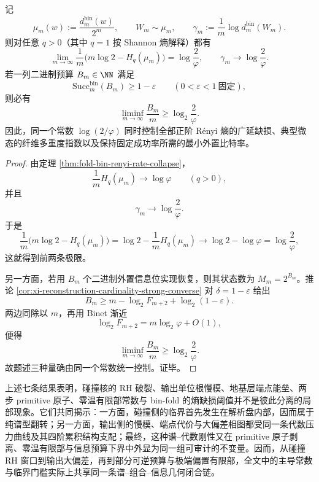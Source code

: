 \begin{theorem}[熵缺损常数的三重同一化]\label{thm:xi-time-part68-entropy-deficit-triple-identification}
记
\[
\mu_m(w):=\frac{d_m^{\mathrm{bin}}(w)}{2^m},
\qquad
W_m\sim\mu_m,
\qquad
\gamma_m:=\frac{1}{m}\log d_m^{\mathrm{bin}}(W_m).
\]
则对任意 \(q>0\)（其中 \(q=1\) 按 Shannon 熵解释）都有
\[
\lim_{m\to\infty}\frac{1}{m}\bigl(m\log 2-H_q(\mu_m)\bigr)
=
\log\frac{2}{\varphi},
\qquad
\gamma_m\longrightarrow \log\frac{2}{\varphi}.
\]
若一列二进制预算 \(B_m\in\NN\) 满足
\[
\mathrm{Succ}_m^{\mathrm{bin}}(B_m)\ge 1-\varepsilon
\qquad
(0<\varepsilon<1\ \text{固定}),
\]
则必有
\[
\liminf_{m\to\infty}\frac{B_m}{m}
\ge
\log_2\frac{2}{\varphi}.
\]
因此，同一个常数 \(\log(2/\varphi)\) 同时控制全部正阶 Rényi 熵的广延缺损、典型微态的纤维多重度指数以及保持固定成功率所需的最小外置比特率。
\end{theorem}
\begin{proof}
由定理 \ref{thm:fold-bin-renyi-rate-collapse}，
\[
\frac{1}{m}H_q(\mu_m)\longrightarrow \log\varphi
\qquad (q>0),
\]
并且
\[
\gamma_m\longrightarrow \log\frac{2}{\varphi}.
\]
于是
\[
\frac{1}{m}\bigl(m\log 2-H_q(\mu_m)\bigr)
=
\log 2-\frac{1}{m}H_q(\mu_m)
\longrightarrow
\log 2-\log\varphi
=
\log\frac{2}{\varphi},
\]
这就得到前两条极限。

另一方面，若用 \(B_m\) 个二进制外置信息位实现恢复，则其状态数为 \(M_m=2^{B_m}\)。推论 \ref{cor:xi-reconstruction-cardinality-strong-converse} 对 \(\delta=1-\varepsilon\) 给出
\[
B_m
\ge
m-\log_2F_{m+2}+\log_2(1-\varepsilon).
\]
两边同除以 \(m\)，再用 Binet 渐近
\[
\log_2F_{m+2}=m\log_2\varphi+O(1),
\]
便得
\[
\liminf_{m\to\infty}\frac{B_m}{m}\ge \log_2\frac{2}{\varphi}.
\]
故题述三种量确由同一个常数统一控制。证毕。
\end{proof}

\noindent
上述七条结果表明，碰撞核的 RH 破裂、输出单位根慢模、地基层端点能垒、两步 primitive 原子、零温有限部常数与 bin-fold 的熵缺损阈值并不是彼此分离的局部现象。它们共同揭示：一方面，碰撞侧的临界首先发生在解析盘内部，因而属于纯谱型翻转；另一方面，输出侧的慢模、端点代价与大偏差相图都受同一条代数压力曲线及其四阶累积结构支配；最终，这种谱--代数刚性又在 primitive 原子剥离、零温有限部与信息预算下界中外显为同一组可审计的不变量。因而，从碰撞 RH 窗口到输出大偏差，再到部分可逆预算与极端偏置有限部，全文中的主导常数与临界门槛实际上共享同一条谱--组合--信息几何闭合链。



\endinput
